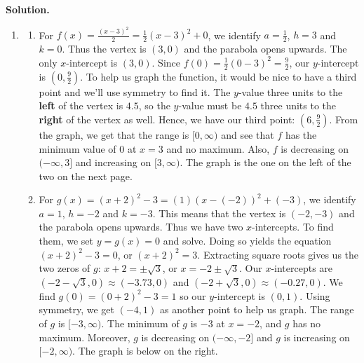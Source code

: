\documentclass{ximera}
\begin{document}
\begin{ex}
\begin{enumerate}
\begin{center}
\end{center}

\end{enumerate}

\vspace*{-.15in}

\enlargethispage{.1in}

{\bf Solution.}

\begin{enumerate}

\item

\begin{enumerate}

\item For $f(x) = \frac{(x-3)^2}{2}  = \frac{1}{2} (x-3)^2+0$, we identify $a = \frac{1}{2}$, $h = 3$ and $k = 0$.  Thus the vertex is $(3,0)$ and the parabola opens upwards.  The only $x$-intercept is $(3,0)$.  Since $f(0) = \frac{1}{2} (0-3)^2 = \frac{9}{2}$, our $y$-intercept is $\left(0, \frac{9}{2}\right)$.  To help us graph the function, it would be nice to have a third point and we'll use symmetry to find it.  The $y$-value three units to the \textbf{left} of the vertex is $4.5$, so the $y$-value must be $4.5$ three units to the \textbf{right} of the vertex as well.  Hence, we have our third point:  $\left(6, \frac{9}{2}\right)$.  From the graph, we get that the range is $[0, \infty)$ and see that $f$ has the minimum value of $0$ at $x = 3$ and no maximum.  Also, $f$ is decreasing on $(-\infty, 3]$ and increasing on $[3, \infty)$.  The graph is the one on the left of the two on the next page.

\item For $g(x) = (x+2)^2 - 3 = (1)(x-(-2))^2+(-3)$, we identify $a = 1$, $h = -2$ and $k = -3$.  This means that the vertex is $(-2,-3)$ and the parabola opens upwards.  Thus we have two $x$-intercepts. To find them, we set $y = g(x) = 0$ and solve.  Doing so yields the equation $(x+2)^2 - 3 = 0$, or $(x+2)^2 = 3$.  Extracting square roots gives us the two zeros of $g$:  $x + 2 = \pm \sqrt{3}$, or $x = -2 \pm \sqrt{3}$.  Our $x$-intercepts are $(-2-\sqrt{3}, 0) \approx (-3.73, 0)$ and $(-2+\sqrt{3}, 0) \approx (-0.27, 0)$.  We find $g(0) = (0+2)^2-3 = 1$ so our $y$-intercept is $(0,1)$.  Using symmetry, we get $(-4,1)$ as another point to help us graph.  The range of $g$ is $[-3, \infty)$.  The minimum of $g$ is $-3$ at $x = -2$, and $g$ has no maximum. Moreover, $g$ is decreasing on $(-\infty, -2]$ and $g$ is increasing on $[-2, \infty)$.  The graph is below on the right.


\end{enumerate}
\end{enumerate}
\end{ex}
\end{document}
